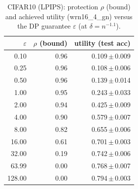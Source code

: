 \begin{table}[t]
  \centering
  \caption{CIFAR10 (LPIPS): protection $\rho$ (bound) and achieved utility (wrn16_4_gn) versus the DP guarantee $\varepsilon$ (at $\delta=n^{-1.1}$).}
  \label{tab:util_cifar10_lpips}
  \begin{tabular}{r r r}
    \toprule
    $\varepsilon$ & $\rho$ (bound) & utility (test acc) \\
    \midrule
    0.10 & 0.96 & 0.109\,$\pm$\,0.009 \\
    0.25 & 0.96 & 0.108\,$\pm$\,0.006 \\
    0.50 & 0.96 & 0.139\,$\pm$\,0.014 \\
    1.00 & 0.95 & 0.243\,$\pm$\,0.033 \\
    2.00 & 0.94 & 0.425\,$\pm$\,0.009 \\
    4.00 & 0.90 & 0.579\,$\pm$\,0.007 \\
    8.00 & 0.82 & 0.655\,$\pm$\,0.006 \\
    16.00 & 0.61 & 0.701\,$\pm$\,0.003 \\
    32.00 & 0.19 & 0.742\,$\pm$\,0.006 \\
    63.99 & 0.00 & 0.768\,$\pm$\,0.007 \\
    128.00 & 0.00 & 0.794\,$\pm$\,0.003 \\
    \bottomrule
  \end{tabular}
\end{table}
